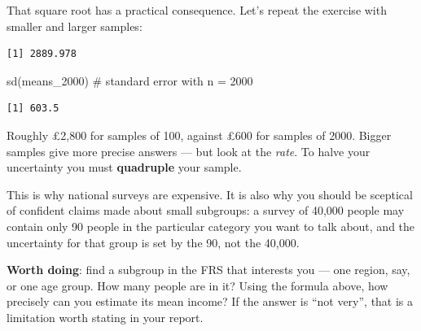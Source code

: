 \documentclass[
  letterpaper,
  DIV=11,
  numbers=noendperiod]{scrreprt}
\newenvironment{Shaded}{\begin{snugshade}}{\end{snugshade}}
\newcommand{\AttributeTok}[1]{\textcolor[rgb]{0.40,0.45,0.13}{#1}}
\newcommand{\CommentTok}[1]{\textcolor[rgb]{0.37,0.37,0.37}{#1}}
\newcommand{\DecValTok}[1]{\textcolor[rgb]{0.68,0.00,0.00}{#1}}
\newcommand{\FunctionTok}[1]{\textcolor[rgb]{0.28,0.35,0.67}{#1}}
\newcommand{\NormalTok}[1]{\textcolor[rgb]{0.00,0.23,0.31}{#1}}
\newcommand{\OtherTok}[1]{\textcolor[rgb]{0.00,0.23,0.31}{#1}}
\newcommand{\SpecialCharTok}[1]{\textcolor[rgb]{0.37,0.37,0.37}{#1}}
\begin{document}
That square root has a practical consequence. Let's repeat the exercise
with smaller and larger samples:

\begin{Shaded}
\end{Shaded}

\begin{verbatim}
[1] 2889.978
\end{verbatim}

\begin{Shaded}
\begin{Highlighting}[]
\FunctionTok{sd}\NormalTok{(means\_2000)  }\CommentTok{\# standard error with n = 2000}
\end{Highlighting}
\end{Shaded}

\begin{verbatim}
[1] 603.5
\end{verbatim}

Roughly £2,800 for samples of 100, against £600 for samples of 2000.
Bigger samples give more precise answers --- but look at the
\emph{rate}. To halve your uncertainty you must \textbf{quadruple} your
sample.

This is why national surveys are expensive. It is also why you should be
sceptical of confident claims made about small subgroups: a survey of
40,000 people may contain only 90 people in the particular category you
want to talk about, and the uncertainty for that group is set by the 90,
not the 40,000.

\textbf{Worth doing}: find a subgroup in the FRS that interests you ---
one region, say, or one age group. How many people are in it? Using the
formula above, how precisely can you estimate its mean income? If the
answer is ``not very'', that is a limitation worth stating in your
report.
\end{document}
